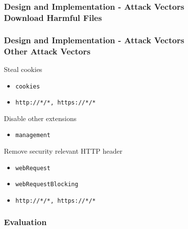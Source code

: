 \documentclass[accentcolor=tud9c,colorbacktitle,xcolor=dvipsnames]{tudbeamer}
\begin{document}
\begin{frame}
    \frametitle{Design and Implementation - Attack Vectors \\ Download Harmful Files}

    
\end{frame}

\begin{frame}
    \frametitle{Design and Implementation - Attack Vectors \\ Other Attack Vectors}
    \begin{block}{Steal cookies}
        \begin{itemize}
            \item \texttt{cookies} 
            \item \texttt{http://*/*, https://*/*}
        \end{itemize}
    \end{block}
    \begin{block}{Disable other extensions}
        \begin{itemize}
            \item \texttt{management}
        \end{itemize}
    \end{block}
    \begin{block}{Remove security relevant HTTP header}
        \begin{itemize}
            \item \texttt{webRequest}
            \item \texttt{webRequestBlocking}
            \item \texttt{http://*/*, https://*/*}
        \end{itemize}
    \end{block}
\end{frame}

\begin{frame}  
    \frametitle{Evaluation}
\end{frame}
\end{document}
